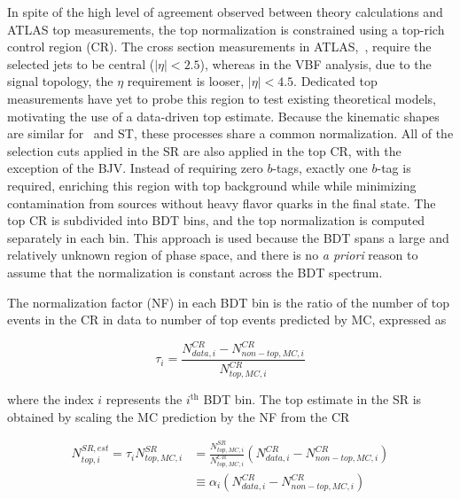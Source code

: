 
In spite of the high level of agreement observed between theory
calculations and ATLAS top measurements, the top normalization is
constrained using a top-rich control region (CR). The cross section
measurements in
ATLAS,~\cite{bib:ttbar_cross_section,bib:Wt_cross_section}, require
the selected jets to be central ($|\eta|<2.5$), whereas in the VBF
analysis, due to the signal topology, the $\eta$ requirement is looser,
$|\eta|<4.5$. Dedicated top measurements have yet to probe this region
to test existing theoretical models, motivating the use of a
data-driven top estimate. Because the kinematic
shapes are similar for \ttbar~and ST, these processes share a common
normalization. All of the selection cuts applied in the SR are also
applied in the top CR, with the exception of the BJV. Instead of
requiring zero $b$-tags, exactly one $b$-tag is required, enriching
this region with top background while while minimizing contamination from
sources without heavy flavor quarks in the final state. The top CR is
subdivided into BDT bins, and the top
normalization is computed separately in each bin. This approach is
used because the BDT spans a large and relatively unknown region of
phase space, and there is no \textit{a priori} reason to assume that the
normalization is constant across the BDT spectrum. 

The normalization factor (NF) in each BDT bin is the ratio of the number of
top events in the CR in data to number of top events
predicted by MC, expressed as

\begin{equation}
\label{chap:analysis:equation:top_nf}
\tau_i = \frac{N_{data,i}^{CR} - N_{non-top,MC,i}^{CR}}{N_{top,MC,i}^{CR}}
\end{equation}

\noindent where the index $i$ represents the $i^{\textrm{th}}$ BDT bin. The top estimate in the SR is obtained by scaling the MC
prediction by the NF from the CR

\begin{equation}
\begin{aligned}
\label{chap:analysis:equation:top_est}
N_{top,i}^{SR,est} = \tau_i N_{top,MC,i}^{SR}
& = \frac{N_{top,MC,i}^{SR}}{N_{top,MC,i}^{CR}}(N_{data,i}^{CR} -
N_{non-top,MC,i}^{CR}) \\
& \equiv \alpha_i (N_{data,i}^{CR} - N_{non-top,MC,i}^{CR})
\end{aligned}
\end{equation}


